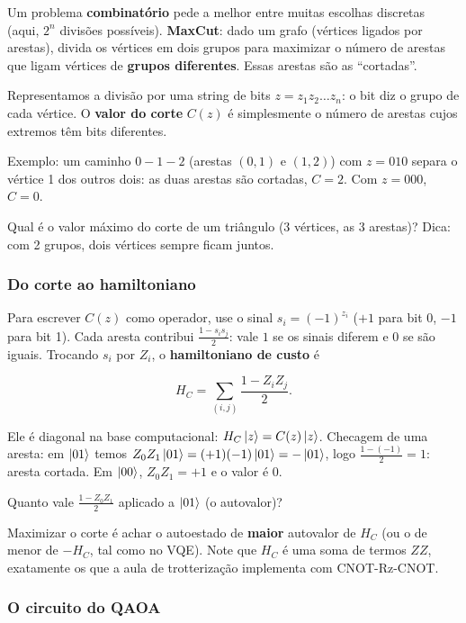 Um problema \textbf{combinatório} pede a melhor entre muitas escolhas discretas (aqui, \(2^n\) divisões possíveis). \textbf{MaxCut}: dado um grafo (vértices ligados por arestas), divida os vértices em dois grupos para maximizar o número de arestas que ligam vértices de \textbf{grupos diferentes}. Essas arestas são as ``cortadas''.

Representamos a divisão por uma string de bits \(z = z_1 z_2\dots z_n\): o bit diz o grupo de cada vértice. O \textbf{valor do corte} \(C(z)\) é simplesmente o número de arestas cujos extremos têm bits diferentes.

Exemplo: um caminho \(0 - 1 - 2\) (arestas \((0,1)\) e \((1,2)\)) com \(z = 010\) separa o vértice 1 dos outros dois: as duas arestas são cortadas, \(C = 2\). Com \(z=000\), \(C=0\).

Qual é o valor máximo do corte de um triângulo (3 vértices, as 3 arestas)? Dica: com 2 grupos, dois vértices sempre ficam juntos.

\subsubsection{Do corte ao hamiltoniano}\label{do-corte-ao-hamiltoniano}

Para escrever \(C(z)\) como operador, use o sinal \(s_i = (-1)^{z_i}\) (\(+1\) para bit 0, \(-1\) para bit 1). Cada aresta contribui \(\frac{1 - s_is_j}{2}\): vale \(1\) se os sinais diferem e \(0\) se são iguais. Trocando \(s_i\) por \(Z_i\), o \textbf{hamiltoniano de custo} é

\[
H_C = \sum_{(i,j)} \frac{1 - Z_iZ_j}{2}.
\]

Ele é diagonal na base computacional: \(H_C\left|{z}\right> = C(z)\left|{z}\right>\). Checagem de uma aresta: em \(\left|{01}\right>\) temos \(Z_0Z_1\left|{01}\right> = (+1)(-1)\left|{01}\right> = -\left|{01}\right>\), logo \(\frac{1-(-1)}{2} = 1\): aresta cortada. Em \(\left|{00}\right>\), \(Z_0Z_1=+1\) e o valor é \(0\).

Quanto vale \(\frac{1 - Z_0Z_1}{2}\) aplicado a \(\left|{01}\right>\) (o autovalor)?

Maximizar o corte é achar o autoestado de \textbf{maior} autovalor de \(H_C\) (ou o de menor de \(-H_C\), tal como no VQE). Note que \(H_C\) é uma soma de termos \(ZZ\), exatamente os que a aula de trotterização implementa com CNOT-Rz-CNOT.

\subsubsection{O circuito do QAOA}\label{o-circuito-do-qaoa}

